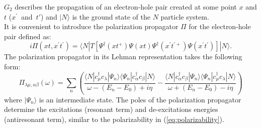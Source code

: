 \documentclass[11pt]{article}
\begin{document}
\noindent $G_{2}$ describes
the propagation of an electron-hole pair created at some point $x$ and $t$ ($x^{\prime}$~and~$t'$) and
$|N\rangle$ is the ground state of the $N$ particle system.\\
It is convenient to introduce the polarization propagator $\Pi$ for the
 electron-hole pair defined as:
\begin{equation}
i\Pi(x t,x^{\prime} t^{\prime}) =
\langle N | T \left[
\Psi^\dagger(x t^{+})
\Psi(x t)
\Psi^\dagger(x^{\prime} t^{\prime +})
\Psi(x^{\prime}t^{\prime})
\right] | N \rangle.
\end{equation}
The polarization propagator in its Lehman representation takes the following form:
\begin{equation}
\Pi_{\lambda \mu,\alpha \beta}(\omega) = \sum_{n}(
\frac{\langle N | c^{\dagger}_{\mu} c_{\lambda} | \Psi_{n}\rangle 
      \langle \Psi_{n} | c^{\dagger}_{\alpha} c_{\beta}| N \rangle}
     { \omega - (E_{n} - E_{0}) + i\eta}
- \frac{\langle N | c^{\dagger}_{\alpha} c_{\beta}| \Psi_{n}\rangle 
      \langle \Psi_{n} | c^{\dagger}_{\mu} c_{\lambda} | N \rangle }
     {\omega + (E_{n} - E_{0}) - i\eta})
\end{equation}
where $| \Psi_{n}\rangle$ is an intermediate state.
The poles of the polarization propagator determine the excitations (resonant term)
 and de-excitations energies (antiresonant term), similar to 
the polarizability in (\ref{eq:polarizability}). 
\end{document}
